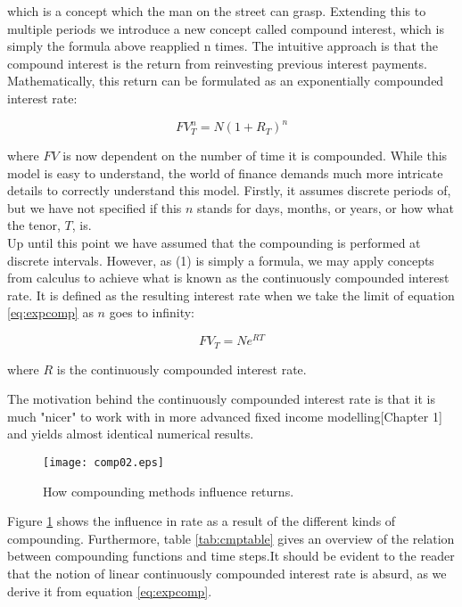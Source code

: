 which is a concept which the man on the street can grasp. Extending this to 
multiple periods we introduce a new concept called compound interest, which is 
simply the formula above reapplied n times. The intuitive approach is that the 
compound interest is the return from reinvesting previous interest payments. 
Mathematically, this return can be formulated as an exponentially compounded 
interest rate:

\begin{equation}\label{eq:expcomp}
FV_T^n = N (1 + R_T)^n
\end{equation}

where $FV$ is now dependent on the number of time it is compounded.
While this model is easy to understand, the world of finance demands much more 
intricate details to correctly understand this model. Firstly, it assumes 
discrete periods of, but we have not specified if this $n$ stands for days, months, 
or years, or how what the tenor, $T$, is.\\

Up until this point we have assumed that the compounding is performed at 
discrete intervals. However, as (1) is simply a formula, we may apply concepts 
from calculus to achieve what is known as the continuously compounded interest 
rate. It is defined as the resulting interest rate when we take the limit of 
equation \ref{eq:expcomp} as $n$ goes to infinity:

\begin{equation}\label{eq:expcomp}
FV_T = N e^{RT}
\end{equation}

where $R$ is the continuously compounded interest rate.

The motivation behind the continuously compounded interest rate is that it is much
"nicer" to work with in more advanced fixed income modelling\cite{cmunk}[Chapter 1]
and yields almost identical numerical results.\\

\begin{figure}[!htb]
\centering
\texttt{[image: comp02.eps]}
\caption{How compounding methods influence returns.}
\label{fig:comp02}
\end{figure}

Figure \ref{fig:comp02} shows the influence in rate as a result of the different
kinds of compounding. Furthermore, table \ref{tab:cmptable} gives an overview of
the relation between compounding functions and time steps.It should be evident to 
the reader that the notion of linear continuously compounded interest rate is 
absurd, as we derive it from equation \ref{eq:expcomp}.

